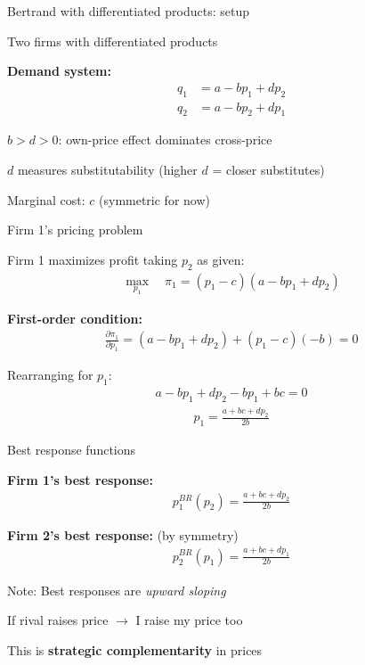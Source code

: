 \documentclass[notes,11pt, aspectratio=169]{beamer}
\newenvironment{wideitemize}{\itemize\addtolength{\itemsep}{10pt}}{\enditemize}
\begin{document}
\begin{frame}{Bertrand with differentiated products: setup}
	\begin{wideitemize}
		\item Two firms with differentiated products
		\item \textbf{Demand system:}
		\begin{align*}
			q_1 &= a - bp_1 + dp_2 \\
			q_2 &= a - bp_2 + dp_1
		\end{align*}
		\item $b > d > 0$: own-price effect dominates cross-price
		\item $d$ measures substitutability (higher $d$ = closer substitutes)
		\item Marginal cost: $c$ (symmetric for now)
	\end{wideitemize}
\end{frame}

\begin{frame}{Firm 1's pricing problem}
	\begin{wideitemize}
		\item Firm 1 maximizes profit taking $p_2$ as given:
		\begin{align*}
			\max_{p_1} \quad \pi_1 = (p_1 - c)(a - bp_1 + dp_2)
		\end{align*}
		\item \textbf{First-order condition:}
		\begin{align*}
			\frac{\partial \pi_1}{\partial p_1} = (a - bp_1 + dp_2) + (p_1 - c)(-b) = 0
		\end{align*}
		\item Rearranging for $p_1$:
		\begin{align*}
			a - bp_1 + dp_2 - bp_1 + bc = 0
		\end{align*}
		\begin{align*}
			p_1 = \frac{a + bc + dp_2}{2b}
		\end{align*}
	\end{wideitemize}
\end{frame}

\begin{frame}{Best response functions}
	\begin{wideitemize}
		\item \textbf{Firm 1's best response:}
		\begin{align*}
			p_1^{BR}(p_2) = \frac{a + bc + dp_2}{2b}
		\end{align*}
		\item \textbf{Firm 2's best response:} (by symmetry)
		\begin{align*}
			p_2^{BR}(p_1) = \frac{a + bc + dp_1}{2b}
		\end{align*}
		\item Note: Best responses are \textit{upward sloping}
		\item If rival raises price $\rightarrow$ I raise my price too
		\item This is \textbf{strategic complementarity} in prices
	\end{wideitemize}
\end{frame}
\end{document}
